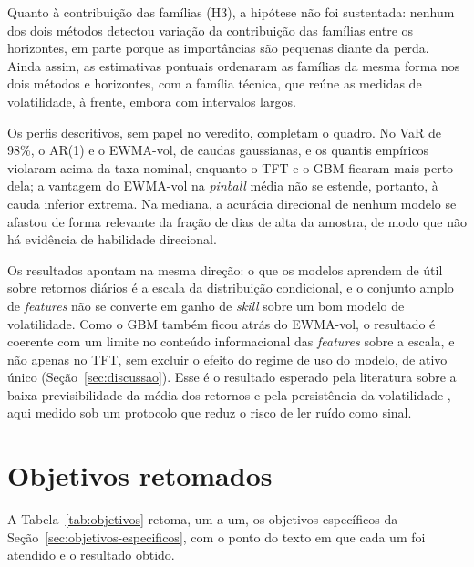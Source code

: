 Quanto à contribuição das famílias (H3), a hipótese não foi sustentada: nenhum dos dois métodos detectou variação da contribuição das famílias entre os horizontes, em parte porque as importâncias são pequenas diante da perda. Ainda assim, as estimativas pontuais ordenaram as famílias da mesma forma nos dois métodos e horizontes, com a família técnica, que reúne as medidas de volatilidade, à frente, embora com intervalos largos.

Os perfis descritivos, sem papel no veredito, completam o quadro. No VaR de 98\%, o AR(1) e o EWMA-vol, de caudas gaussianas, e os quantis empíricos violaram acima da taxa nominal, enquanto o TFT e o GBM ficaram mais perto dela; a vantagem do EWMA-vol na \textit{pinball} média não se estende, portanto, à cauda inferior extrema. Na mediana, a acurácia direcional de nenhum modelo se afastou de forma relevante da fração de dias de alta da amostra, de modo que não há evidência de habilidade direcional.

Os resultados apontam na mesma direção: o que os modelos aprendem de útil sobre retornos diários é a escala da distribuição condicional, e o conjunto amplo de \textit{features} não se converte em ganho de \textit{skill} sobre um bom modelo de volatilidade. Como o GBM também ficou atrás do EWMA-vol, o resultado é coerente com um limite no conteúdo informacional das \textit{features} sobre a escala, e não apenas no TFT, sem excluir o efeito do regime de uso do modelo, de ativo único (Seção~\ref{sec:discussao}). Esse é o resultado esperado pela literatura sobre a baixa previsibilidade da média dos retornos \cite{GU2020} e pela persistência da volatilidade \cite{CONT2001}, aqui medido sob um protocolo que reduz o risco de ler ruído como sinal.

\section{Objetivos retomados}
A Tabela~\ref{tab:objetivos} retoma, um a um, os objetivos específicos da Seção~\ref{sec:objetivos-especificos}, com o ponto do texto em que cada um foi atendido e o resultado obtido.

